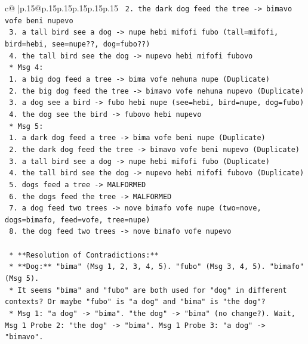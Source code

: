\documentclass{article}
\begin{document}
{\begin{supertabular}{c@{$\;$}|p{.15\linewidth}@{}p{.15\linewidth}p{.15\linewidth}p{.15\linewidth}p{.15\linewidth}p{.15\linewidth}}
{{{\texttt{            2. the dark dog feed the tree {-}> bimavo vofe beni nupevo} \\
\texttt{            3. a tall bird see a dog {-}> nupe hebi mifofi fubo (tall=mifofi, bird=hebi, see=nupe??, dog=fubo??)} \\
\texttt{            4. the tall bird see the dog {-}> nupevo hebi mifofi fubovo} \\
\texttt{        *   Msg 4:} \\
\texttt{            1. a big dog feed a tree {-}> bima vofe nehuna nupe (Duplicate)} \\
\texttt{            2. the big dog feed the tree {-}> bimavo vofe nehuna nupevo (Duplicate)} \\
\texttt{            3. a dog see a bird {-}> fubo hebi nupe (see=hebi, bird=nupe, dog=fubo)} \\
\texttt{            4. the dog see the bird {-}> fubovo hebi nupevo} \\
\texttt{        *   Msg 5:} \\
\texttt{            1. a dark dog feed a tree {-}> bima vofe beni nupe (Duplicate)} \\
\texttt{            2. the dark dog feed the tree {-}> bimavo vofe beni nupevo (Duplicate)} \\
\texttt{            3. a tall bird see a dog {-}> nupe hebi mifofi fubo (Duplicate)} \\
\texttt{            4. the tall bird see the dog {-}> nupevo hebi mifofi fubovo (Duplicate)} \\
\texttt{            5. dogs feed a tree {-}> MALFORMED} \\
\texttt{            6. the dogs feed the tree {-}> MALFORMED} \\
\texttt{            7. a dog feed two trees {-}> nove bimafo vofe nupe (two=nove, dogs=bimafo, feed=vofe, tree=nupe)} \\
\texttt{            8. the dog feed two trees {-}> nove bimafo vofe nupevo} \\
\\ 
\texttt{    *   **Resolution of Contradictions:**} \\
\texttt{        *   **Dog:** "bima" (Msg 1, 2, 3, 4, 5). "fubo" (Msg 3, 4, 5). "bimafo" (Msg 5).} \\
\texttt{            *   It seems "bima" and "fubo" are both used for "dog" in different contexts? Or maybe "fubo" is "a dog" and "bima" is "the dog"?} \\
\texttt{            *   Msg 1: "a dog" {-}> "bima". "the dog" {-}> "bima" (no change?). Wait, Msg 1 Probe 2: "the dog" {-}> "bima". Msg 1 Probe 3: "a dog" {-}> "bimavo".} \\
}}}
\end{supertabular}}
\end{document}
